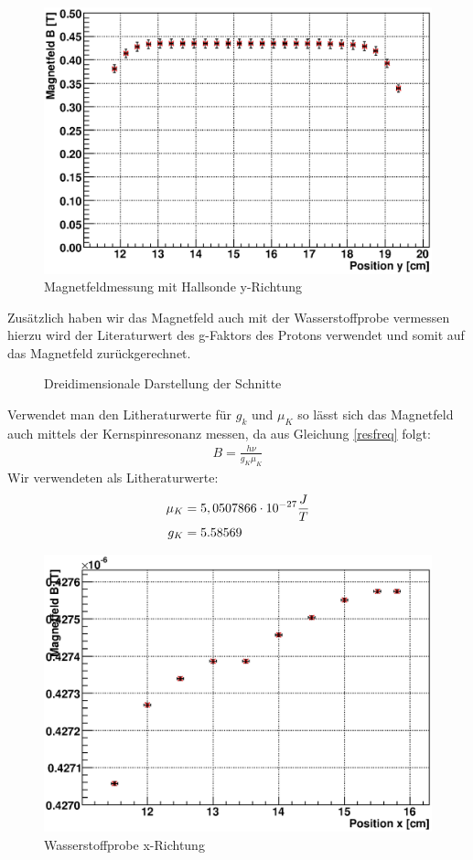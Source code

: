 \documentclass[12pt]{article}
\begin{document}
\begin{figure}[H]
\centering
\includegraphics[width=0.9\linewidth]{pictures/hallsonde_y.eps}
\caption{Magnetfeldmessung mit Hallsonde y-Richtung}
\label{hally}
\end{figure}

Zusätzlich haben wir das Magnetfeld auch mit der Wasserstoffprobe vermessen hierzu wird der Literaturwert des g-Faktors des Protons verwendet und somit auf das Magnetfeld zurückgerechnet.

\begin{figure}[H]
\centering
\caption{Dreidimensionale Darstellung der Schnitte}
\label{hallxy}
\label{hally}
\end{figure}

Verwendet man den Litheraturwerte für $g_k$ und $\mu_K$ so lässt sich das Magnetfeld auch mittels der Kernspinresonanz messen, da aus Gleichung \ref{resfreq} folgt:
\begin{align}
 B = \frac{h \nu}{g_K \mu_K}
\end{align}
Wir verwendeten als Litheraturwerte:
\begin{align}
 \notag \mu_K &= 5,0507866\cdot 10^{-27} \frac{J}{T} \\
 \notag g_K &= 5.58569
\end{align}


\begin{figure}[H]
\centering
\includegraphics[width=0.9\linewidth]{pictures/wasser_x.eps}
\caption{Wasserstoffprobe x-Richtung}
\end{figure}
\end{document}
